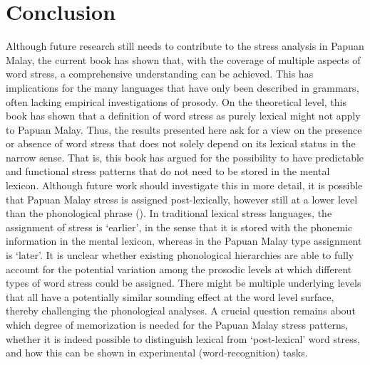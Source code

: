 \section{Conclusion}
Although future research still needs to contribute to the stress analysis in Papuan Malay, the current book has shown that, with the coverage of multiple aspects of word stress, a comprehensive understanding can be achieved. This has implications for the many languages that have only been described in grammars, often lacking empirical investigations of prosody. On the theoretical level, this book has shown that a definition of word stress as purely lexical might not apply to Papuan Malay. Thus, the results presented here ask for a view on the presence or absence of word stress that does not solely depend on its lexical status in the narrow sense. That is, this book has argued for the possibility to have predictable and functional stress patterns that do not need to be stored in the mental lexicon. Although future work should investigate this in more detail, it is possible that Papuan Malay stress is assigned post-lexically, however still at a lower level than the phonological phrase (\citealt{nespor_prosodic_2007}). In traditional lexical stress languages, the assignment of stress is `earlier', in the sense that it is stored with the phonemic information in the mental lexicon, whereas in the Papuan Malay type assignment is `later'. It is unclear whether existing phonological hierarchies are able to fully account for the potential variation among the prosodic levels at which different types of word stress could be assigned. There might be multiple underlying levels that all have a potentially similar sounding effect at the word level surface, thereby challenging the phonological analyses. A crucial question remains about which degree of memorization is needed for the Papuan Malay stress patterns, whether it is indeed possible to distinguish lexical from `post-lexical' word stress, and how this can be shown in experimental (word-recognition) tasks.